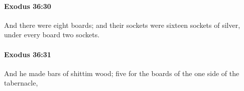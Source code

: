 		\paragraph{Exodus 36:30} %
			\label{EXODUS-36-30}

			And there were eight boards; and their sockets were sixteen sockets of silver, under every board two sockets.


		\paragraph{Exodus 36:31} %
			\label{EXODUS-36-31}

			And he made bars of shittim wood; five for the boards of the one side of the tabernacle,


